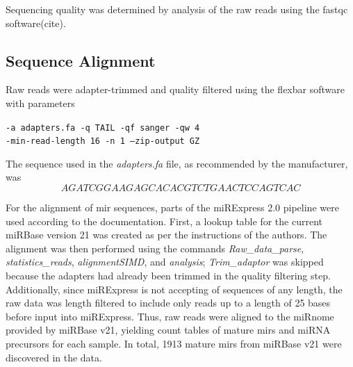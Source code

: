 Sequencing quality was determined by analysis of the raw reads using the fastqc software(cite).  

\subsection{Sequence Alignment}
Raw reads were adapter-trimmed and quality filtered using the flexbar software\cite{Roehr2017} with parameters

\begin{center}\texttt{-a adapters.fa -q TAIL -qf sanger -qw 4 \\-min-read-length 16 -n 1 --zip-output GZ}\end{center} 

The sequence used in the \textit{adapters.fa} file, as recommended by the manufacturer, was $$AGATCGGAAGAGCACACGTCTGAACTCCAGTCAC$$ 

For the alignment of \ac{mir} sequences, parts of the miRExpress 2.0\cite{Wang2009} pipeline were used according to the documentation. First, a lookup table for the current miRBase version 21 was created as per the instructions of the authors. The alignment was then performed using the commands \textit{Raw\_data\_parse}, \textit{statistics\_reads}, \textit{alignmentSIMD}, and \textit{analysis}; \textit{Trim\_adaptor}  was skipped because the adapters had already been trimmed in the quality filtering step. Additionally, since miRExpress is not accepting of sequences of any length, the raw data was length filtered to include only reads up to a length of 25 bases before input into miRExpress. Thus, raw reads were aligned to the miRnome provided by miRBase v21, yielding count tables of mature \acp{mir} and miRNA precursors for each sample. In total, 1913 mature \acp{mir} from miRBase v21 were discovered in the data.

